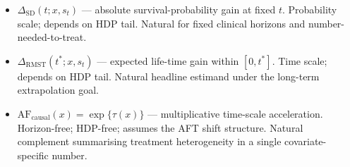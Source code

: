 \documentclass[11pt]{article}
\theoremstyle{plain}
\theoremstyle{definition}
\theoremstyle{remark}
\newcommand{\1}{\mathds{1}}
\newcommand{\tauf}{\tau}
\newcommand{\RMST}{\mathrm{RMST}}
\newcommand{\SD}{\mathrm{SD}}
\newcommand{\AF}{\mathrm{AF}}
\begin{document}
\begin{itemize}[leftmargin=*]
  \item $\Delta_{\SD}(t; x, s_{t})$ --- absolute survival-probability
        gain at fixed $t$. Probability scale; depends on HDP tail.
        Natural for fixed clinical horizons and number-needed-to-treat.
  \item $\Delta_{\RMST}(t^{*}; x, s_{t})$ --- expected life-time gain
        within $[0, t^{*}]$. Time scale; depends on HDP tail.
        Natural headline estimand under the long-term extrapolation goal.
  \item $\AF_{\mathrm{causal}}(x) = \exp\{\tauf(x)\}$ --- multiplicative
        time-scale acceleration. Horizon-free; HDP-free; assumes
        the AFT shift structure. Natural complement summarising treatment
        heterogeneity in a single covariate-specific number.
\end{itemize}



\end{document}
